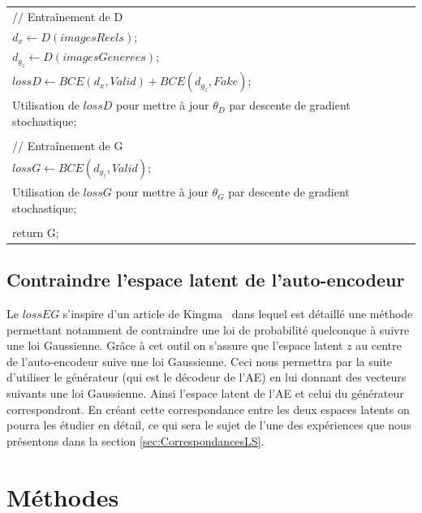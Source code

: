\documentclass[11pt,francais]{article}
\begin{document}
\begin{table}[t!]
\begin{tabular}{l}
  \hspace{1cm}// Entraînement de D\tabularnewline
  \hspace{1cm}\(d_x \leftarrow D(imagesReels)\);\tabularnewline
  \hspace{1cm}\(d_{g_z} \leftarrow D(imagesGenerees)\);\tabularnewline
  \hspace{1cm}\(lossD \leftarrow BCE(d_x,Valid) + BCE(d_{g_z},Fake)\);\tabularnewline
  \hspace{1cm}Utilisation de \(lossD\) pour mettre à jour \(\theta_D\) par descente de gradient stochastique;\tabularnewline
  \tabularnewline
  
  \hspace{1cm}// Entraînement de G\tabularnewline
  \hspace{1cm}\(lossG\leftarrow BCE(d_{g_z},Valid)\);\tabularnewline
  \hspace{1cm}Utilisation de \(lossG\) pour mettre à jour \(\theta_G\) par descente de gradient stochastique;\tabularnewline
  \tabularnewline
  
  return G;\tabularnewline
  \hline
  \end{tabular}
  \label{tab:tab2}
\end{table}


\subsection{Contraindre l'espace latent de l'auto-encodeur}
\label{sec:LatentSpace}
Le \(lossEG\) s'inspire d'un article de Kingma~\cite{kingma2013auto} dans lequel est détaillé une méthode permettant notamment de contraindre une loi de probabilité quelconque à suivre une loi Gaussienne. Grâce à cet outil on s'assure que l'espace latent \(z\) au centre de l'auto-encodeur suive une loi Gaussienne. Ceci nous permettra par la suite d'utiliser le générateur (qui est le décodeur de l'AE) en lui donnant des vecteurs suivants une loi Gaussienne. Ainsi l'espace latent de l'AE et celui du générateur correspondront.
En créant cette correspondance entre les deux espaces latents on pourra les étudier en détail, ce qui sera le sujet de l'une des expériences que nous présentons dans la section \ref{sec:CorrespondancesLS}.

\section{Méthodes}
\end{document}
